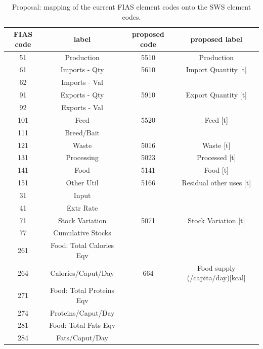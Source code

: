 \documentclass[nojss]{jss}
\begin{document}
\begin{table}[t]
\caption{Proposal: mapping of the current FIAS element codes onto the SWS element codes.}
\centering
\begin{tabular}{c|c|c|c}
\toprule
FIAS code  & label & proposed code & proposed label                    \\
\midrule

51   &	Production     & 5510 & Production                             \\
61   &	Imports - Qty  & 5610 & Import Quantity [t]                    \\
62   &	Imports - Val  &      &                                        \\

91   &	Exports - Qty  & 5910 & Export Quantity [t]                    \\
92   &	Exports - Val  &      &                                        \\
                  
101   &	Feed           & 5520 & Feed [t]                               \\
111   &	Breed/Bait     &      &                                        \\
                  
121   &	Waste          &    5016 & Waste [t]                           \\
131   &	Processing     &    5023 & Processed [t]                       \\
141   &	Food           &    5141 & Food [t]                            \\
151   &	Other Util     &    5166 & Residual other uses [t]             \\
                  
31   &	Input          &                     &                         \\
41   &	Extr Rate      &                     &                         \\ 

71   &	Stock Variation   &   5071 & Stock Variation [t]               \\
77   &	Cumulative Stocks &        &                                   \\

261   &	Food: Total Calories Eqv  &     &                  \\ 
264   &	Calories/Caput/Day        & 664 & Food supply (/capita/day)[kcal] \\             
271   &	Food: Total Proteins Eqv  &     &                  \\    
274   &	Proteins/Caput/Day        &     &                  \\      
281   &	Food: Total Fats Eqv      &     &                  \\    
284   &	Fats/Caput/Day            &     &                  \\    

\bottomrule
\end{tabular}
\label{tab:xxx}
\end{table} 
\end{document}
